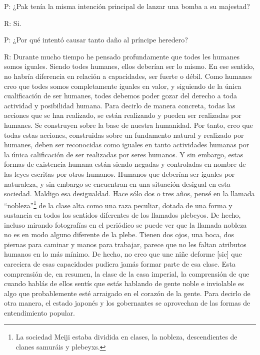 \documentclass[
]{book}
\begin{document}
P: ¿Pak tenía la misma intención principal de lanzar una bomba a su majestad?

R: Si.

P: ¿Por qué intentó causar tanto daño al príncipe heredero?

R: Durante mucho tiempo he pensado profundamente que todes les humanes somos iguales. Siendo todes humanes, ellos deberían ser lo mismo. En ese sentido, no habría diferencia en relación a capacidades, ser fuerte o débil. Como humanes creo que todes somos completamente iguales en valor, y siguiendo de la única cualificación de ser humanes, todes debemos poder gozar del derecho a toda actividad y posibilidad humana.
Para decirlo de manera concreta, todas las acciones que se han realizado, se están realizando y pueden ser realizadas por humanes. Se construyen sobre la base de nuestra humanidad. Por tanto, creo que todas estas acciones, construidas sobre un fundamento natural y realizado por humanes, deben ser reconocidas como iguales en tanto actividades humanas por la única calificación de ser realizadas por seres humanos. Y sin embargo, estas formas de existencia humana están siendo negadas y controladas en nombre de las leyes escritas por otros humanos. Humanos que deberían ser iguales por naturaleza, y sin embargo se encuentran en una situación desigual en esta sociedad. Maldigo esa desigualdad. Hace sólo dos o tres años, pensé en la llamada ``nobleza''\footnote{La sociedad Meiji estaba dividida en clases, la nobleza, descendientes de clanes samuráis y plebeyxs.} de la clase alta como una raza peculiar, dotada de una forma y sustancia en todos los sentidos diferentes de los llamados plebeyos. De hecho, incluso mirando fotografías en el periódico se puede ver que la llamada nobleza no es en modo alguno diferente de la plebe. Tienen dos ojos, una boca, dos piernas para caminar y manos para trabajar, parece que no les faltan atributos humanos en lo más mínimo.
De hecho, no creo que une niñe deforme {[}sic{]} que careciera de esas capacidades pudiera jamás formar parte de esa clase. Esta comprensión de, en resumen, la clase de la casa imperial, la comprensión de que cuando hablás de ellos sentís que estás hablando de gente noble e inviolable es algo que probablemente esté arraigado en el corazón de la gente. Para decirlo de otra manera, el estado japonés y los gobernantes se aprovechan de las formas de entendimiento popular.
\end{document}
